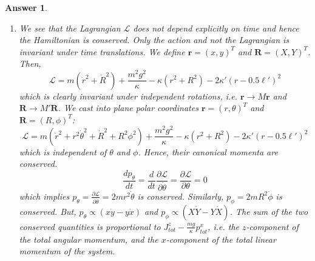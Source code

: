 \documentclass[a4paper]{article}
\newtheorem{ans}{Answer}[section]
\theoremstyle{new}
\begin{document}
\begin{ans}
\begin{enumerate}[label=(\alph*)]
Set determinant as zero, we then have the eigenvalues to be
$$0=\det\begin{pmatrix}x_0^2-\lambda&x_0y_0\\x_0y_0&y_0^2-\lambda\\\end{pmatrix}=\lambda^2-\lambda(x_0^2+y_0^2)\implies\lambda=0,~x_0^2+y_0^2$$
Scale the eigenvalues back by a factor:
$$\omega=0,\quad\omega^2=(x_0^2+y_0^2)\frac{(\kappa+2\kappa')^3}{(\kappa'\ell')^2m}=\frac{\kappa'^2\ell'^2}{(\kappa+2\kappa')^2}\frac{(\kappa+2\kappa')^3}{(\kappa'\ell')^2m}=\frac{\kappa+2\kappa'}{m}$$
where their eigenvectors respectively are
$$\begin{pmatrix}\delta x\\\delta y\\\end{pmatrix}=\begin{pmatrix}y_0\\-x_0\\\end{pmatrix},\quad\begin{pmatrix}\delta x\\\delta y\\\end{pmatrix}=\begin{pmatrix}x_0\\y_0\\\end{pmatrix}$$
where the former (zero-frequency mode) is due to rotational symmetry in the $(x,y)$ plane.
\item We see that the Lagrangian $\mathcal{L}$ does not depend explicitly on time and hence the Hamiltonian is conserved. Only the action and not the Lagrangian is invariant under time translations. We define $\boldsymbol{r}=(x,y)^T$ and $\mathbf{R}=(X,Y)^T$. Then, 
$$\mathcal{L}=m(\dot{r}^2+\dot{R}^2)+\frac{m^2g^2}{\kappa}-\kappa(r^2+R^2)-2\kappa'(r-0.5\ell')^2$$
which is clearly invariant under independent rotations, i.e. $\mathbf{r}\rightarrow M\mathbf{r}$ and $\mathbf{R}\rightarrow M'\mathbf{R}$. We cast into plane polar coordinates $\mathbf{r}=(r,\theta)^T$ and $\mathbf{R}=(R,\phi)^T$:
$$\mathcal{L}=m(\dot{r}^2+r^2\dot{\theta}^2+\dot{R}^2+R^2\phi^2)+\frac{m^2g^2}{\kappa}-\kappa(r^2+R^2)-2\kappa'(r-0.5\ell')^2$$
which is independent of $\theta$ and $\phi$. Hence, their canonical momenta are conserved.
$$\frac{dp_\theta}{dt}=\frac{d}{dt}\frac{\partial\mathcal{L}}{\partial\dot{\theta}}=\frac{\partial\mathcal{L}}{\partial\theta}=0$$
which implies $p_\theta=\frac{\partial\mathcal{L}}{\partial\dot{\theta}}=2mr^2\dot{\theta}$ is conserved. Similarly, $p_\phi=2mR^2\dot{\phi}$ is conserved. But, $p_\theta\propto(x\dot{y}-y\dot{x})$ and $p_\phi\propto(X\dot{Y}-Y\dot{X})$. The sum of the two conserved quantities is proportional to $J^z_{tot}-\frac{mg}{\kappa}p_{tot}^x$, i.e. the $z$-component of the total angular momentum, and the $x$-component of the total linear momentum of the system.
\end{enumerate}
\end{ans}
\newpage
\end{document}
